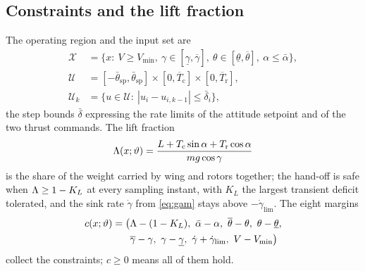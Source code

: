 \documentclass[final,5p,times,twocolumn]{elsarticle}
\begin{document}
\subsection{Constraints and the lift fraction}
The operating region and the input set are
\begin{align}
\mathcal X&=\{x:\ V\ge V_{\min},\ \gamma\in[\underline\gamma,\overline\gamma],\ \theta\in[\underline\theta,\overline\theta],\ \alpha\le\bar\alpha\},\label{eq:X}\\
\mathcal U&=[-\bar\theta_{\mathrm{sp}},\bar\theta_{\mathrm{sp}}]\times[0,\overline T_{\mathrm c}]\times[0,\overline T_{\mathrm r}],\nonumber\\ \mathcal U_k&=\{u\in\mathcal U:\ |u_i-u_{i,k-1}|\le\bar\delta_i\},\label{eq:U}
\end{align}
the step bounds $\bar\delta$ expressing the rate limits of the attitude setpoint and of the two thrust commands. The lift fraction
\begin{equation}\label{eq:lf}
\Lambda(x;\vartheta)=\frac{L+T_{\mathrm c}\sin\alpha+T_{\mathrm r}\cos\alpha}{mg\cos\gamma}
\end{equation}
is the share of the weight carried by wing and rotors together; the hand-off is safe when $\Lambda\ge1-K_L$ at every sampling instant, with $K_L$ the largest transient deficit tolerated, and the sink rate $\dot\gamma$ from \eqref{eq:gam} stays above $-\dot\gamma_{\lim}$. The eight margins
\begin{equation}\label{eq:c}
\begin{aligned}c(x;\vartheta)=\big(&\lf-(1-K_L),\ \bar\alpha-\alpha,\ \overline\theta-\theta,\ \theta-\underline\theta,\\ &\overline\gamma-\gamma,\ \gamma-\underline\gamma,\ \dot\gamma+\dot\gamma_{\lim},\ V-V_{\min}\big)\end{aligned}
\end{equation}
collect the constraints; $c\ge0$ means all of them hold.
\end{document}
